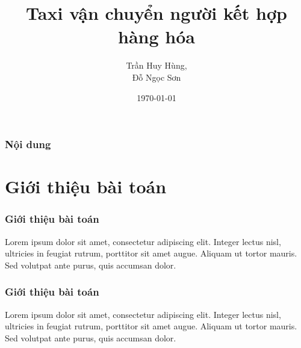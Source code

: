 \documentclass{beamer}
\title[Short title]{Taxi vận chuyển người kết hợp hàng hóa} %
\author{Trần Huy Hùng,\\ Đỗ Ngọc Sơn} %
\institute[UCLA] %
{
	Đại học Bách Khoa Hà Nội \\ %
	\medskip
}
\date{\today} %
\begin{document}
	
	\begin{frame}
		\titlepage %
	\end{frame}
	
	\begin{frame}
		\frametitle{Nội dung} %
		\tableofcontents %
	\end{frame}
	
	
	\section{Giới thiệu bài toán} %
	
	
	\begin{frame}
		\frametitle{Giới thiệu bài toán}
		Lorem ipsum dolor sit amet, consectetur adipiscing elit. Integer lectus nisl, ultricies in feugiat rutrum, porttitor sit amet augue. Aliquam ut tortor mauris. Sed volutpat ante purus, quis accumsan dolor.
	\end{frame}

	
	\begin{frame}
		\frametitle{Giới thiệu bài toán}
		Lorem ipsum dolor sit amet, consectetur adipiscing elit. Integer lectus nisl, ultricies in feugiat rutrum, porttitor sit amet augue. Aliquam ut tortor mauris. Sed volutpat ante purus, quis accumsan dolor.
	\end{frame}
	
\end{document}
